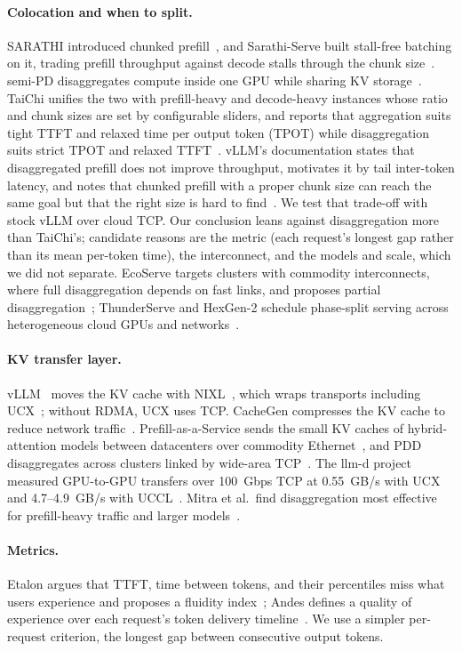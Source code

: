 \documentclass[11pt]{article}
\begin{document}
\paragraph{Colocation and when to split.} SARATHI introduced chunked prefill~\cite{sarathi2023}, and Sarathi-Serve built stall-free batching on it, trading prefill throughput against decode stalls through the chunk size~\cite{sarathi}. semi-PD disaggregates compute inside one GPU while sharing KV storage~\cite{semipd}. TaiChi unifies the two with prefill-heavy and decode-heavy instances whose ratio and chunk sizes are set by configurable sliders, and reports that aggregation suits tight TTFT and relaxed time per output token (TPOT) while disaggregation suits strict TPOT and relaxed TTFT~\cite{taichi}. vLLM's documentation states that disaggregated prefill does not improve throughput, motivates it by tail inter-token latency, and notes that chunked prefill with a proper chunk size can reach the same goal but that the right size is hard to find~\cite{vllmdocs}. We test that trade-off with stock vLLM over cloud TCP. Our conclusion leans against disaggregation more than TaiChi's; candidate reasons are the metric (each request's longest gap rather than its mean per-token time), the interconnect, and the models and scale, which we did not separate. EcoServe targets clusters with commodity interconnects, where full disaggregation depends on fast links, and proposes partial disaggregation~\cite{ecoserve}; ThunderServe and HexGen-2 schedule phase-split serving across heterogeneous cloud GPUs and networks~\cite{thunderserve,hexgen2}.

\paragraph{KV transfer layer.} vLLM~\cite{vllm} moves the KV cache with NIXL~\cite{nixl}, which wraps transports including UCX~\cite{ucx}; without RDMA, UCX uses TCP. CacheGen compresses the KV cache to reduce network traffic~\cite{cachegen}. Prefill-as-a-Service sends the small KV caches of hybrid-attention models between datacenters over commodity Ethernet~\cite{prfaas}, and PDD disaggregates across clusters linked by wide-area TCP~\cite{pdd}. The llm-d project measured GPU-to-GPU transfers over 100~Gbps TCP at 0.55~GB/s with UCX and 4.7--4.9~GB/s with UCCL~\cite{llmdblog}. Mitra et al.\ find disaggregation most effective for prefill-heavy traffic and larger models~\cite{beyondbuzz}.

\paragraph{Metrics.} Etalon argues that TTFT, time between tokens, and their percentiles miss what users experience and proposes a fluidity index~\cite{etalon}; Andes defines a quality of experience over each request's token delivery timeline~\cite{andes}. We use a simpler per-request criterion, the longest gap between consecutive output tokens.
\end{document}
